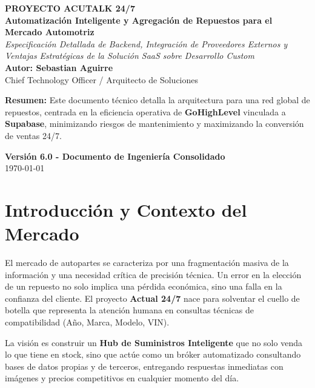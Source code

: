 \documentclass[12pt,a4paper]{article}
\begin{document}
\begin{titlepage}
    \centering
    \vspace*{1.5cm}
    \Huge \textbf{PROYECTO ACUTALK 24/7} \\
    \vspace{0.8cm}
    \LARGE \textbf{Automatización Inteligente y Agregación de Repuestos para el Mercado Automotriz} \\
    \vspace{1.5cm}
    \large \textit{Especificación Detallada de Backend, Integración de Proveedores Externos y Ventajas Estratégicas de la Solución SaaS sobre Desarrollo Custom} \\
    \vspace{2.5cm}
    \textbf{Autor: Sebastian Aguirre} \\
    \small Chief Technology Officer / Arquitecto de Soluciones \\
    \vspace{3cm}
    \begin{minipage}{0.8\textwidth}
        \centering
        \textbf{Resumen:} Este documento t\'ecnico detalla la arquitectura para una red global de repuestos, centrada en la eficiencia operativa de \textbf{GoHighLevel} vinculada a \textbf{Supabase}, minimizando riesgos de mantenimiento y maximizando la conversión de ventas 24/7.
    \end{minipage}
    \vfill
    \textbf{Versión 6.0 - Documento de Ingenier\'ia Consolidado} \\
    \today
\end{titlepage}

\newpage
\tableofcontents
\newpage

\section{Introducción y Contexto del Mercado}
El mercado de autopartes se caracteriza por una fragmentación masiva de la información y una necesidad cr\'itica de precisi\'on t\'ecnica. Un error en la elección de un repuesto no solo implica una pérdida econ\'omica, sino una falla en la confianza del cliente. El proyecto \textbf{Actual 24/7} nace para solventar el cuello de botella que representa la atención humana en consultas t\'ecnicas de compatibilidad (Año, Marca, Modelo, VIN).

La visión es construir un \textbf{Hub de Suministros Inteligente} que no solo venda lo que tiene en stock, sino que actúe como un bróker automatizado consultando bases de datos propias y de terceros, entregando respuestas inmediatas con imágenes y precios competitivos en cualquier momento del día.
\end{document}
